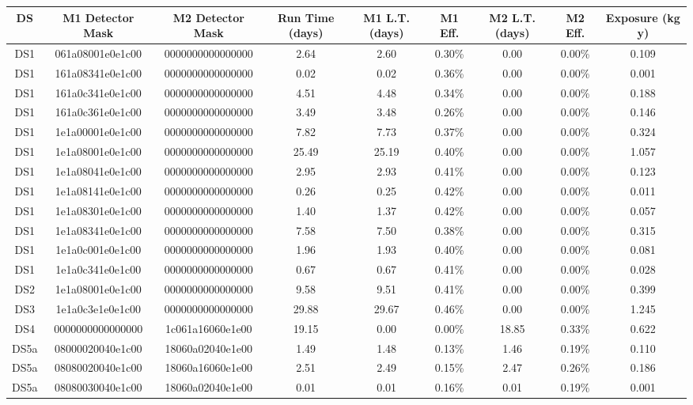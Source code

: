 \begin{tabular}{|c|c c|c|c c|c c|c|}
\hline
  DS & M1 Detector Mask & M2 Detector Mask & Run Time (days) & M1 L.T. (days) & M1 Eff. & M2 L.T. (days) & M2 Eff. & Exposure (kg y) \\
\hline
  DS1 & 061a08001e0e1c00 & 0000000000000000 & 2.64 & 2.60 & 0.30\% & 0.00 & 0.00\% & 0.109 \\
  DS1 & 161a08341e0e1c00 & 0000000000000000 & 0.02 & 0.02 & 0.36\% & 0.00 & 0.00\% & 0.001 \\
  DS1 & 161a0c341e0e1c00 & 0000000000000000 & 4.51 & 4.48 & 0.34\% & 0.00 & 0.00\% & 0.188 \\
  DS1 & 161a0c361e0e1c00 & 0000000000000000 & 3.49 & 3.48 & 0.26\% & 0.00 & 0.00\% & 0.146 \\
  DS1 & 1e1a00001e0e1c00 & 0000000000000000 & 7.82 & 7.73 & 0.37\% & 0.00 & 0.00\% & 0.324 \\
  DS1 & 1e1a08001e0e1c00 & 0000000000000000 & 25.49 & 25.19 & 0.40\% & 0.00 & 0.00\% & 1.057 \\
  DS1 & 1e1a08041e0e1c00 & 0000000000000000 & 2.95 & 2.93 & 0.41\% & 0.00 & 0.00\% & 0.123 \\
  DS1 & 1e1a08141e0e1c00 & 0000000000000000 & 0.26 & 0.25 & 0.42\% & 0.00 & 0.00\% & 0.011 \\
  DS1 & 1e1a08301e0e1c00 & 0000000000000000 & 1.40 & 1.37 & 0.42\% & 0.00 & 0.00\% & 0.057 \\
  DS1 & 1e1a08341e0e1c00 & 0000000000000000 & 7.58 & 7.50 & 0.38\% & 0.00 & 0.00\% & 0.315 \\
  DS1 & 1e1a0c001e0e1c00 & 0000000000000000 & 1.96 & 1.93 & 0.40\% & 0.00 & 0.00\% & 0.081 \\
  DS1 & 1e1a0c341e0e1c00 & 0000000000000000 & 0.67 & 0.67 & 0.41\% & 0.00 & 0.00\% & 0.028 \\
  DS2 & 1e1a08001e0e1c00 & 0000000000000000 & 9.58 & 9.51 & 0.41\% & 0.00 & 0.00\% & 0.399 \\
  DS3 & 1e1a0c3e1e0e1c00 & 0000000000000000 & 29.88 & 29.67 & 0.46\% & 0.00 & 0.00\% & 1.245 \\
  DS4 & 0000000000000000 & 1c061a16060e1e00 & 19.15 & 0.00 & 0.00\% & 18.85 & 0.33\% & 0.622 \\
  DS5a & 08000020040e1c00 & 18060a02040e1e00 & 1.49 & 1.48 & 0.13\% & 1.46 & 0.19\% & 0.110 \\
  DS5a & 08080020040e1c00 & 18060a16060e1e00 & 2.51 & 2.49 & 0.15\% & 2.47 & 0.26\% & 0.186 \\
  DS5a & 08080030040e1c00 & 18060a02040e1e00 & 0.01 & 0.01 & 0.16\% & 0.01 & 0.19\% & 0.001 \\

\end{tabular}
